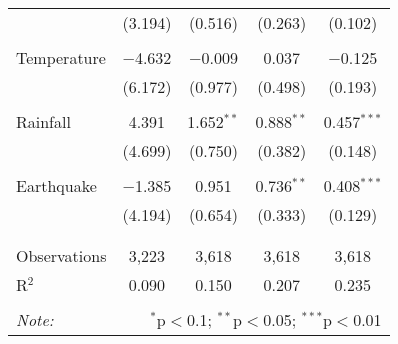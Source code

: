 \begin{table}[!htbp]
\begin{tabular}{@{\extracolsep{5pt}}lcccc}
  & (3.194) & (0.516) & (0.263) & (0.102) \\ 
  & & & & \\ 
 Temperature & $-$4.632 & $-$0.009 & 0.037 & $-$0.125 \\ 
  & (6.172) & (0.977) & (0.498) & (0.193) \\ 
  & & & & \\ 
 Rainfall & 4.391 & 1.652$^{**}$ & 0.888$^{**}$ & 0.457$^{***}$ \\ 
  & (4.699) & (0.750) & (0.382) & (0.148) \\ 
  & & & & \\ 
 Earthquake & $-$1.385 & 0.951 & 0.736$^{**}$ & 0.408$^{***}$ \\ 
  & (4.194) & (0.654) & (0.333) & (0.129) \\ 
  & & & & \\ 
\hline \\[-1.8ex] 
Observations & 3,223 & 3,618 & 3,618 & 3,618 \\ 
R$^{2}$ & 0.090 & 0.150 & 0.207 & 0.235 \\ 
\hline 
\hline \\[-1.8ex] 
\textit{Note:}  & \multicolumn{4}{r}{$^{*}$p$<$0.1; $^{**}$p$<$0.05; $^{***}$p$<$0.01} \\ 
\end{tabular} 
\end{table} 
